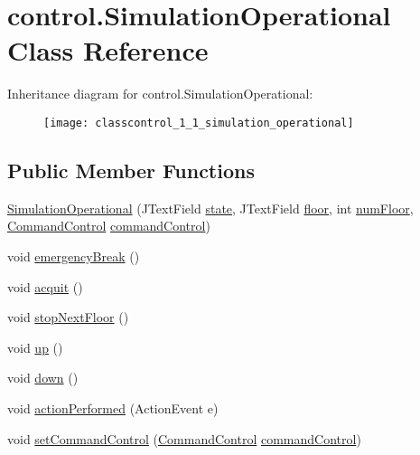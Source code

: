 \hypertarget{classcontrol_1_1_simulation_operational}{}\section{control.\+Simulation\+Operational Class Reference}
\label{classcontrol_1_1_simulation_operational}
Inheritance diagram for control.\+Simulation\+Operational\+:\begin{figure}[H]
\begin{center}
\leavevmode
\texttt{[image: classcontrol\_1\_1\_simulation\_operational]}
\end{center}
\end{figure}
\subsection*{Public Member Functions}
\begin{DoxyCompactItemize}
\item 
\mbox{\hyperlink{classcontrol_1_1_simulation_operational_a05ea4626f887de31e4c40b3ff2e52162}{Simulation\+Operational}} (J\+Text\+Field \mbox{\hyperlink{classcontrol_1_1_simulation_operational_a0bc5bcb8d7007bfcca3cf0e204dfce5f}{state}}, J\+Text\+Field \mbox{\hyperlink{classcontrol_1_1_simulation_operational_ad41ae86e7cedc53680f57db31321c34f}{floor}}, int \mbox{\hyperlink{classcontrol_1_1_simulation_operational_a8b244e8cd89afb3060e4025c76f3ccc1}{num\+Floor}}, \mbox{\hyperlink{interfacecontrol_1_1_command_control}{Command\+Control}} \mbox{\hyperlink{classcontrol_1_1_simulation_operational_a381628f543ab9b586023f718af9a279d}{command\+Control}})
\item 
void \mbox{\hyperlink{classcontrol_1_1_simulation_operational_a1d385c1f369eb3aff538c36b5947f8ed}{emergency\+Break}} ()
\item 
void \mbox{\hyperlink{classcontrol_1_1_simulation_operational_a66881a9f2cf8526dee93b756f8ad47af}{acquit}} ()
\item 
void \mbox{\hyperlink{classcontrol_1_1_simulation_operational_a2ca8414424f8becf5c5942b9dbba80aa}{stop\+Next\+Floor}} ()
\item 
void \mbox{\hyperlink{classcontrol_1_1_simulation_operational_ab3ade4511703ee9715f82ce6e9a036a0}{up}} ()
\item 
void \mbox{\hyperlink{classcontrol_1_1_simulation_operational_a67c7dc0ec1b837a8174d127cb6803eb9}{down}} ()
\item 
void \mbox{\hyperlink{classcontrol_1_1_simulation_operational_a9cce36fe391bc34c0b5bdbbef9244f05}{action\+Performed}} (Action\+Event e)
\item 
void \mbox{\hyperlink{classcontrol_1_1_simulation_operational_a66fd6c0df3888639296a867c106590e3}{set\+Command\+Control}} (\mbox{\hyperlink{interfacecontrol_1_1_command_control}{Command\+Control}} \mbox{\hyperlink{classcontrol_1_1_simulation_operational_a381628f543ab9b586023f718af9a279d}{command\+Control}})
\end{DoxyCompactItemize}
